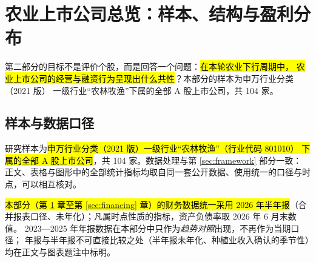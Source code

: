 \section{农业上市公司总览：样本、结构与盈利分布}
\label{sec:comp-overview}

第二部分的目标不是评价个股，而是回答一个问题：\hl{在本轮农业下行周期中，
农业上市公司的经营与融资行为呈现出什么共性}？本部分的样本为申万行业分类（2021 版）
一级行业“农林牧渔”下属的全部 A 股上市公司，共 \num{104} 家。

\subsection{样本与数据口径}
\label{sec:comp-sample}

研究样本为\hl{申万行业分类（2021 版）一级行业“农林牧渔”（行业代码 801010）
下属的全部 A 股上市公司}，共 \num{104} 家。数据处理与第 \ref{sec:framework} 部分一致：
正文、表格与图形中的全部统计指标均取自同一套公开数据、使用统一的口径与时点，可以相互核对。

\hl{本部分（第 \ref{sec:comp-overview} 章至第 \ref{sec:financing} 章）的财务数据统一采用
2026 年半年报}（合并报表口径、未年化）；凡属时点性质的指标，资产负债率取 2026 年 6 月末数值。
2023---2025 年年报数据在本部分中只作为\emph{趋势对照}出现，不再作为当期口径；
年报与半年报不可直接比较之处（半年报未年化、种植业收入确认的季节性）均在正文与图表题注中标明。

